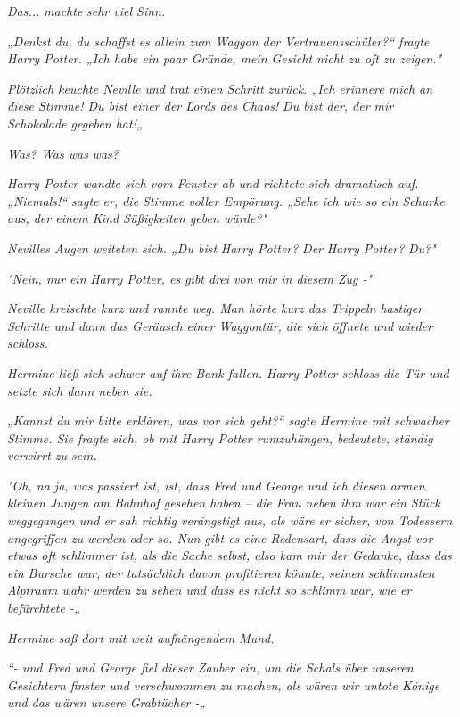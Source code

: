 {\emph{Das...} \emph{\emph{machte}} \emph{sehr viel Sinn.}

\emph{„Denkst du, du schaffst es allein zum Waggon der Vertrauensschüler?“ fragte Harry Potter. „Ich habe ein paar Gründe, mein Gesicht nicht zu oft zu zeigen."}

\emph{Plötzlich keuchte Neville und trat einen Schritt zurück. „Ich erinnere mich an diese Stimme! Du bist einer der Lords des Chaos!} \emph{\emph{Du bist der, der mir Schokolade gegeben hat!}„}

\emph{Was? Was was} \emph{\emph{was?}}

\emph{Harry Potter wandte sich vom Fenster ab und richtete sich dramatisch auf. „\emph{Niemals!}“ sagte er, die Stimme voller Empörung. „Sehe ich wie so ein Schurke aus, der einem Kind Süßigkeiten geben würde?"}

\emph{Nevilles Augen weiteten sich. „\emph{Du bist}} \emph{Harry Potter?} \emph{\emph{Der}} \emph{Harry Potter?} \emph{\emph{Du?}"}

\emph{"Nein, nur} \emph{\emph{ein}} \emph{Harry Potter, es gibt drei von mir in diesem Zug -"}

\emph{Neville kreischte kurz und rannte weg. Man hörte kurz das Trippeln hastiger Schritte und dann das Geräusch einer Waggontür, die sich öffnete und wieder schloss.}

\emph{Hermine ließ sich schwer auf ihre Bank fallen. Harry Potter schloss die Tür und setzte sich dann neben sie.}

\emph{„Kannst du mir bitte erklären, was vor sich geht?“ sagte Hermine mit schwacher Stimme. Sie fragte sich, ob mit Harry Potter rumzuhängen, bedeutete, ständig verwirrt zu sein.}

\emph{"Oh, na ja, was passiert ist, ist, dass Fred und George und ich diesen armen kleinen Jungen am Bahnhof gesehen haben -- die Frau neben ihm war ein Stück weggegangen und er sah richtig verängstigt aus, als wäre er sicher, von Todessern angegriffen zu werden oder so. Nun gibt es eine Redensart, dass die Angst vor etwas oft schlimmer ist, als die Sache selbst, also kam mir der Gedanke, dass das ein Bursche war, der tatsächlich davon profitieren könnte, seinen schlimmsten Alptraum wahr werden zu sehen und dass es nicht so schlimm war, wie er befürchtete -„}

\emph{Hermine saß dort mit weit aufhängendem Mund.}

\emph{“- und Fred und George fiel dieser Zauber ein, um die Schals über unseren Gesichtern finster und verschwommen zu machen, als wären wir untote Könige und das wären unsere Grabtücher -„}

}
